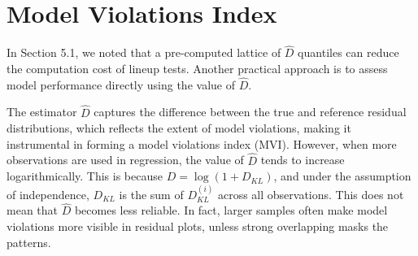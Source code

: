 \documentclass[]{interact}
\theoremstyle{plain}%
\theoremstyle{definition}
\theoremstyle{remark}
\begin{document}
\begin{table}
\centering
\caption{\label{tab:best-hyperparameter}Hyperparameters values for the optimized computer vision models with different input sizes.}
\centering
{}
\end{table}

\section{Model Violations Index}\label{sec-model-violations-index}

In Section 5.1, we noted that a pre-computed lattice of \(\hat{D}\)
quantiles can reduce the computation cost of lineup tests. Another
practical approach is to assess model performance directly using the
value of \(\hat{D}\).

The estimator \(\hat{D}\) captures the difference between the true and
reference residual distributions, which reflects the extent of model
violations, making it instrumental in forming a model violations index
(MVI). However, when more observations are used in regression, the value
of \(\hat{D}\) tends to increase logarithmically. This is because
\(D = \log(1 + D_{KL})\), and under the assumption of independence,
\(D_{KL}\) is the sum of \(D_{KL}^{(i)}\) across all observations. This
does not mean that \(\hat{D}\) becomes less reliable. In fact, larger
samples often make model violations more visible in residual plots,
unless strong overlapping masks the patterns.
\end{document}
